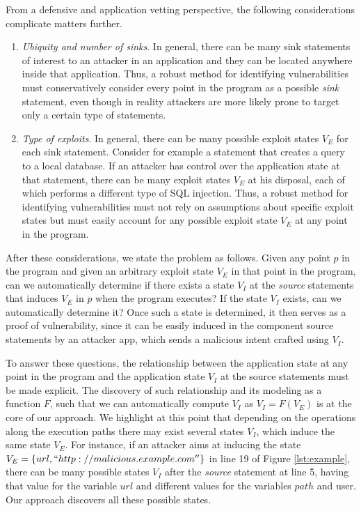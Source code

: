 From a defensive and application vetting perspective, the following considerations complicate matters further.
\begin{enumerate}
	\item \emph{Ubiquity and number of sinks}. In general, there can be many sink statements of interest to an attacker in an application and they can be located anywhere inside that application. Thus, a robust method for identifying vulnerabilities must conservatively consider every point in the program as a possible \textit{sink} statement, even though in reality attackers are more likely prone to target only a certain type of statements.
	\item \emph{Type of exploits}. In general, there can be many possible exploit states $V_E$ for each sink statement. Consider for example a statement that creates a query to a local database. If an attacker has control over the application state at that  statement, there can be many exploit states $V_E$ at his disposal, each of which performs a different type of SQL injection. 
	Thus, a robust method for identifying vulnerabilities must not rely on assumptions about specific exploit states but must easily account for any possible exploit state $V_E$ at any point in the program.
\end{enumerate}

After these considerations, we state the problem as follows. Given any point $p$ in the program and given an arbitrary exploit state $V_E$ in that point in the program, can we automatically determine if there exists a state $V_I$ at the \textit{source} statements that induces $V_E$ in $p$ when the program executes? If the state $V_I$ exists, can we automatically determine it? Once such a state is determined, it then serves as a proof of vulnerability, since it can be easily induced in the component source statements by an attacker app, which sends a malicious intent crafted using $V_I$. 

To answer these questions, the relationship between the application state at any point in the program and the application state $V_I$ at the source statements must be made explicit. The discovery of such relationship and its modeling as a function $F$, such that we can automatically compute $V_I$ as $V_I = F(V_E)$ is at the core of our approach. We highlight at this point that depending on the operations along the execution paths there may exist several states $V_I$, which induce the same state $V_E$. For instance, if an attacker aims at inducing the state $V_E = \{ url, ``http://malicious.example.com''\}$ in line 19 of Figure \ref{lst:example}, there can be many possible states $V_I$ after the \textit{source} statement at line 5, having that value for the variable $url$ and different values for the variables $path$ and user. Our approach discovers all these possible states. 

